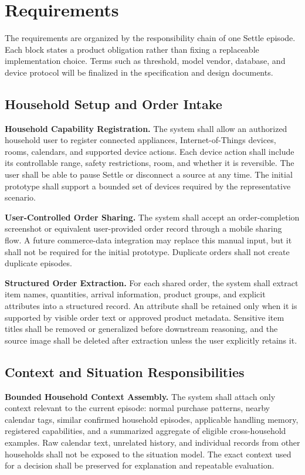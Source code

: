 \documentclass[conference]{IEEEtran}
\newcommand{\req}[1]{\par\addvspace{3pt}\noindent\textbf{#1}}
\begin{document}
\section{Requirements}

The requirements are organized by the responsibility chain of one Settle episode. Each block states a product obligation rather than fixing a replaceable implementation choice. Terms such as threshold, model vendor, database, and device protocol will be finalized in the specification and design documents.

\subsection{Household Setup and Order Intake}

\req{Household Capability Registration.}
The system shall allow an authorized household user to register connected appliances, Internet-of-Things devices, rooms, calendars, and supported device actions. Each device action shall include its controllable range, safety restrictions, room, and whether it is reversible. The user shall be able to pause Settle or disconnect a source at any time. The initial prototype shall support a bounded set of devices required by the representative scenario.

\req{User-Controlled Order Sharing.}
The system shall accept an order-completion screenshot or equivalent user-provided order record through a mobile sharing flow. A future commerce-data integration may replace this manual input, but it shall not be required for the initial prototype. Duplicate orders shall not create duplicate episodes.

\req{Structured Order Extraction.}
For each shared order, the system shall extract item names, quantities, arrival information, product groups, and explicit attributes into a structured record. An attribute shall be retained only when it is supported by visible order text or approved product metadata. Sensitive item titles shall be removed or generalized before downstream reasoning, and the source image shall be deleted after extraction unless the user explicitly retains it.

\subsection{Context and Situation Responsibilities}

\req{Bounded Household Context Assembly.}
The system shall attach only context relevant to the current episode: normal purchase patterns, nearby calendar tags, similar confirmed household episodes, applicable handling memory, registered capabilities, and a summarized aggregate of eligible cross-household examples. Raw calendar text, unrelated history, and individual records from other households shall not be exposed to the situation model. The exact context used for a decision shall be preserved for explanation and repeatable evaluation.
\end{document}
